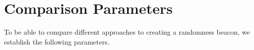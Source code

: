 \section{Comparison Parameters}\label{sub:comparison_parameters}
To be able to compare different approaches to creating a randomness beacon, we establish the following parameters.
%
%
%
